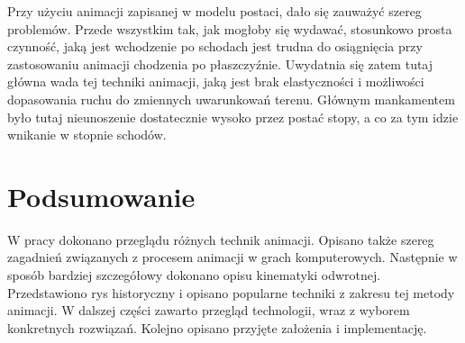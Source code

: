 \documentclass[11pt]{mwrep}
\begin{document}
Przy użyciu animacji zapisanej w modelu postaci, dało się zauważyć szereg problemów. Przede wszystkim tak, jak mogłoby się wydawać, stosunkowo prosta czynność, jaką jest wchodzenie po schodach jest trudna do osiągnięcia przy zastosowaniu animacji chodzenia po płaszczyźnie. Uwydatnia się zatem tutaj główna wada tej techniki animacji, jaką jest brak elastyczności i możliwości dopasowania ruchu do zmiennych uwarunkowań terenu. Głównym mankamentem było tutaj nieunoszenie dostatecznie wysoko przez postać stopy, a co za tym idzie wnikanie w stopnie schodów.

\chapter{Podsumowanie}

W pracy dokonano przeglądu różnych technik animacji. Opisano także szereg zagadnień związanych z procesem animacji w grach komputerowych. Następnie w sposób bardziej szczegółowy dokonano opisu kinematyki odwrotnej. Przedstawiono rys historyczny i opisano popularne techniki z zakresu tej metody animacji. W dalszej części zawarto przegląd technologii, wraz z wyborem konkretnych rozwiązań. Kolejno opisano przyjęte założenia i implementację.

\lstlistoflistings
\end{document}
